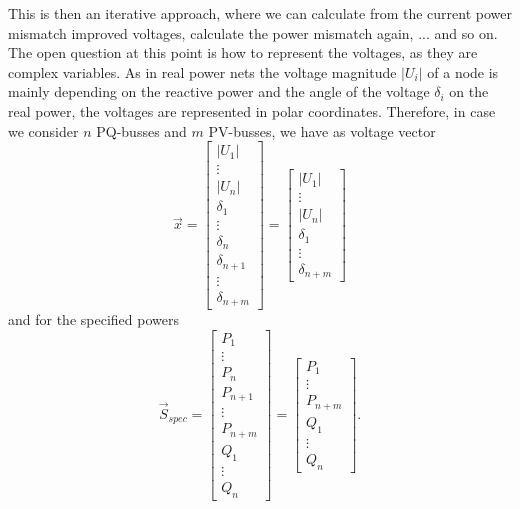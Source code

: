 This is then an iterative approach, where we can calculate from the current power mismatch improved voltages, calculate the power mismatch again, ... and so on. The open question at this point is how to represent the voltages, as they are complex variables. As in real power nets the voltage magnitude $|U_i|$ of a node is mainly depending on the reactive power and the angle of the voltage $\delta_i$ on the real power, the voltages are represented in polar coordinates. Therefore, in case we consider $n$ PQ-busses and $m$ PV-busses, we have as voltage vector 
\begin{equation}
	\vec x = 
	\begin{bmatrix}
		|U_1| \\
		\vdots \\
		|U_n| \\
		\delta_1 \\
		\vdots \\
		\delta_n \\
		\delta_{n + 1} \\
		\vdots \\
		\delta_{n + m} 
	\end{bmatrix} = 	
	\begin{bmatrix}
		|U_1| \\
		\vdots \\
		|U_n| \\
		\delta_1 \\
		\vdots \\
		\delta_{n + m} 
	\end{bmatrix}
\end{equation}
and for the specified powers
\begin{equation}
	\vec S_{spec} = 
	\begin{bmatrix}
		P_1 \\
		\vdots \\
		P_n \\
		P_{n + 1} \\
		\vdots \\
		P_{n + m} \\
		Q_1 \\
		\vdots \\
		Q_n
	\end{bmatrix} = 
	\begin{bmatrix}
		P_1 \\
		\vdots \\
		P_{n + m} \\
		Q_1 \\
		\vdots \\
		Q_n
	\end{bmatrix}.
\end{equation}

